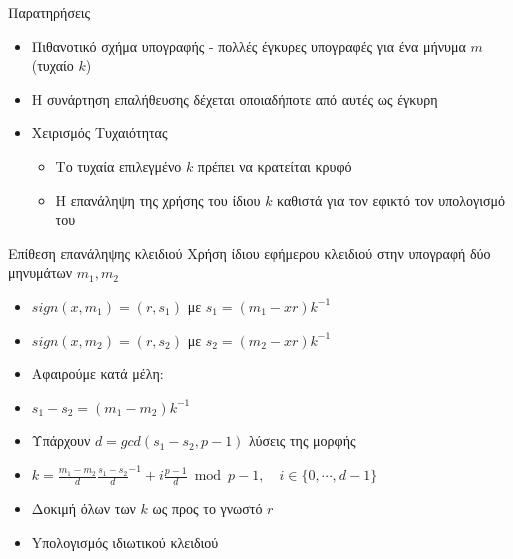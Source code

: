\documentclass[handout]{beamer}
\begin{document}
\begin{frame}{Παρατηρήσεις}
\begin{itemize}
\item Πιθανοτικό σχήμα υπογραφής - πολλές έγκυρες υπογραφές για ένα μήνυμα $m$ (τυχαίο $k$)
\pause
\item Η συνάρτηση επαλήθευσης δέχεται οποιαδήποτε από αυτές ως έγκυρη
\pause
\item Χειρισμός Τυχαιότητας
\begin{itemize}
\item Το τυχαία επιλεγμένο $k$ πρέπει να κρατείται κρυφό
\item H επανάληψη της χρήσης του ίδιου $k$ καθιστά για τον \adv εφικτό τον υπολογισμό του  
\end{itemize}
\end{itemize}
\end{frame}

\begin{frame}{Επίθεση επανάληψης κλειδιού}
Χρήση ίδιου εφήμερου κλειδιού στην υπογραφή δύο μηνυμάτων $m_1,m_2$
\begin{itemize}
    \item $sign(x,m_1) = (r,s_1)$ με $s_1 = (m_1 - x r) k^{-1} $
    \item $sign(x,m_2) = (r,s_2)$ με $s_2 = (m_2 - x r) k^{-1} $
    \item Αφαιρούμε κατά μέλη:
    \item $s_1 - s_2 = (m_1 - m_2) k^{-1}$
    \item Υπάρχουν $d=gcd(s_1 - s_2,p-1)$ λύσεις της μορφής
    \item $k = \frac{m_1-m_2}{d} \frac{s_1-s_2}{d}^{-1} + i \frac{p-1}{d} \bmod{p-1}, \quad i \in \{0, \cdots,d-1 \}$
    \item Δοκιμή όλων των $k$ ως προς το γνωστό $r$
    \item Yπολογισμός ιδιωτικού κλειδιού
\end{itemize}
\end{frame}
\end{document}
